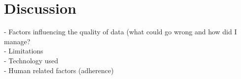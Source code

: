 \documentclass[12pt]{article} %
\begin{document}






\section{Discussion}
- Factors influencing the quality of data (what could go wrong and how did I manage?\\
- Limitations\\
- Technology used\\
- Human related factors (adherence)
\end{document}
